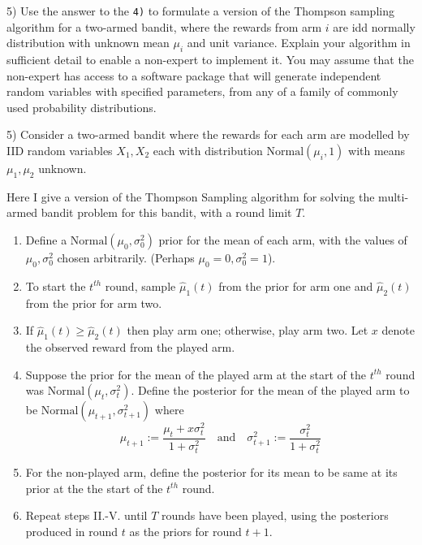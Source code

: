 \documentclass[11pt,a4paper]{article}
\begin{document}
\begin{question}{5)}
  Use the answer to the \texttt{4)} to formulate a version of the Thompson sampling algorithm for a two-armed bandit, where the rewards from arm $i$ are idd normally distribution with unknown mean $\mu_i$ and unit variance. Explain your algorithm in sufficient detail to enable a non-expert to implement it. You may assume that the non-expert has access to a software package that will generate independent random variables with specified parameters, from any of a family of commonly used probability distributions.
\end{question}

\begin{answer}{5)}
  Consider a two-armed bandit where the rewards for each arm are modelled by IID random variables $X_1,X_2$ each with distribution $\text{Normal}(\mu_i,1)$ with means $\mu_1,\mu_2$ unknown.
  \par Here I give a version of the Thompson Sampling algorithm for solving the multi-armed bandit problem for this bandit, with a round limit $T$.
  \renewcommand{\theenumi}{\Roman{enumi}}
  \begin{enumerate}
    \item Define a $\text{Normal}(\mu_0,\sigma_0^2)$ prior for the mean of each arm, with the values of $\mu_0,\sigma^2_0$ chosen arbitrarily. (Perhaps $\mu_0=0,\sigma_0^2=1$).
    \item To start the $t^{th}$ round, sample $\hat\mu_1(t)$ from the prior for arm one and $\hat\mu_2(t)$ from the prior for arm two.
    \item If $\hat\mu_1(t)\geq\hat\mu_2(t)$ then play arm one; otherwise, play arm two. Let $x$ denote the observed reward from the played arm.
    \item Suppose the prior for the mean of the played arm at the start of the $t^{th}$ round was $\text{Normal}(\mu_t,\sigma^2_t)$. Define the posterior for the mean of the played arm to be $\text{Normal}(\mu_{t+1},\sigma^2_{t+1})$ where
    \[ \mu_{t+1}:=\frac{\mu_t+x\sigma^2_t}{1+\sigma^2_t}\quad\text{and}\quad\sigma^2_{t+1}:=\frac{\sigma^2_t}{1+\sigma^2_t} \]
    \item For the non-played arm, define the posterior for its mean to be same at its prior at the the start of the $t^{th}$ round.
    \item Repeat steps II.-V. until $T$ rounds have been played, using the posteriors produced in round $t$ as the priors for round $t+1$.
  \end{enumerate}
\end{answer}
\end{document}
